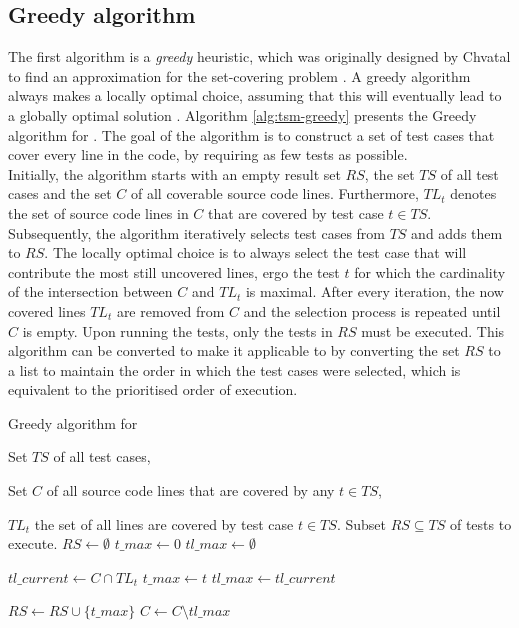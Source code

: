 
\subsection{Greedy algorithm}\label{ssec:alg-greedy}
The first algorithm is a \emph{greedy} heuristic, which was originally designed by Chvatal to find an approximation for the set-covering problem \cite{evaluationoftestsuiteminimization}. A greedy algorithm always makes a locally optimal choice, assuming that this will eventually lead to a globally optimal solution \cite{10.5555/1614191}. Algorithm \ref{alg:tsm-greedy} presents the Greedy algorithm for \tsm{}. The goal of the algorithm is to construct a set of test cases that cover every line in the code, by requiring as few tests as possible.\\

\noindent Initially, the algorithm starts with an empty result set $RS$, the set $TS$ of all test cases and the set $C$ of all coverable source code lines. Furthermore, $TL_t$ denotes the set of source code lines in $C$ that are covered by test case $t \in TS$. Subsequently, the algorithm iteratively selects test cases from $TS$ and adds them to $RS$. The locally optimal choice is to always select the test case that will contribute the most still uncovered lines, ergo the test $t$ for which the cardinality of the intersection between $C$ and $TL_t$ is maximal. After every iteration, the now covered lines $TL_t$ are removed from $C$ and the selection process is repeated until $C$ is empty. Upon running the tests, only the tests in $RS$ must be executed. This algorithm can be converted to make it applicable to \tcp{} by converting the set $RS$ to a list to maintain the order in which the test cases were selected, which is equivalent to the prioritised order of execution.

\begin{algorithm}[h!]
\caption{Greedy algorithm for \tsm{}}
\label{alg:tsm-greedy}
\begin{algorithmic}[1]
	 Set $TS$ of all test cases,
	
	Set $C$ of all source code lines that are covered by any $t \in TS$,
	
	$TL_t$ the set of all lines are covered by test case $t \in TS$.
	 Subset $RS \subseteq TS$ of tests to execute.
	\State $RS \gets \emptyset$
		\State $t\_max \gets 0$
		\State $tl\_max \gets \emptyset$
		
			\State $tl\_current \gets C \cap TL_{t}$
				\State $t\_max \gets t$
				\State $tl\_max \gets tl\_current$
			\EndIf
		\EndFor
		
		\State $RS \gets RS \cup \{t\_max\}$
		\State $C \gets C \setminus tl\_max$
	\EndWhile
\end{algorithmic}
\end{algorithm}
